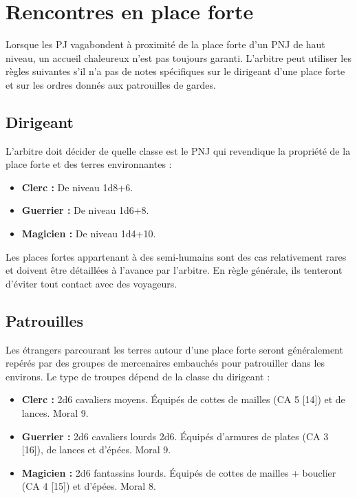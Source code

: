 \section*{Rencontres en place forte}\label{rencontres-en-place-forte}

Lorsque les PJ vagabondent à proximité de la place forte d'un PNJ de
haut niveau, un accueil chaleureux n'est pas toujours garanti. L'arbitre
peut utiliser les règles suivantes s'il n'a pas de notes spécifiques sur
le dirigeant d'une place forte et sur les ordres donnés aux patrouilles
de gardes.

\subsection*{Dirigeant}\label{dirigeant}

L'arbitre doit décider de quelle classe est le PNJ qui revendique la
propriété de la place forte et des terres environnantes :

\begin{itemize}
\item
  \textbf{Clerc :} De niveau 1d8+6.
\item
  \textbf{Guerrier :} De niveau 1d6+8.
\item
  \textbf{Magicien :} De niveau 1d4+10.
\end{itemize}

Les places fortes appartenant à des semi-humains sont des cas
relativement rares et doivent être détaillées à l'avance par l'arbitre.
En règle générale, ils tenteront d'éviter tout contact avec des
voyageurs.

\subsection*{Patrouilles}\label{patrouilles}

Les étrangers parcourant les terres autour d'une place forte seront
généralement repérés par des groupes de mercenaires embauchés pour
patrouiller dans les environs. Le type de troupes dépend de la classe du
dirigeant :

\begin{itemize}
\item
  \textbf{Clerc :} 2d6 cavaliers moyens. Équipés de cottes de mailles
  (CA 5 {[}14{]}) et de lances. Moral 9.
\item
  \textbf{Guerrier :} 2d6 cavaliers lourds 2d6. Équipés d'armures de
  plates (CA 3 {[}16{]}), de lances et d'épées. Moral 9.
\item
  \textbf{Magicien :} 2d6 fantassins lourds. Équipés de cottes de
  mailles + bouclier (CA 4 {[}15{]}) et d'épées. Moral 8.
\end{itemize}

